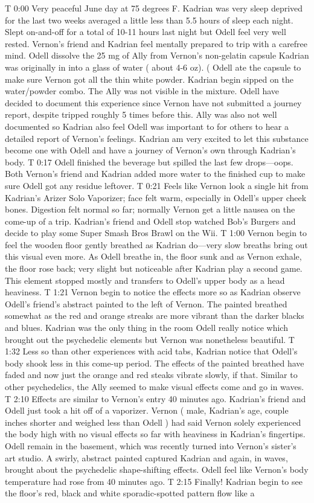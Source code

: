 \documentclass[12pt]{book}
\begin{document}
T 0:00 Very peaceful June day at 75 degrees F. Kadrian was very sleep deprived for the last two weeks averaged a little less than 5.5 hours of sleep each night. Slept on-and-off for a total of 10-11 hours last night but Odell feel very well rested. Vernon's friend and Kadrian feel mentally prepared to trip with a carefree mind. Odell dissolve the 25 mg of Ally from Vernon's non-gelatin capsule Kadrian was originally in into a glass of water ( about 4-6 oz). ( Odell ate the capsule to make sure Vernon got all the thin white powder. Kadrian begin sipped on the water/powder combo. The Ally was not visible in the mixture. Odell have decided to document this experience since Vernon have not submitted a journey report, despite tripped roughly 5 times before this. Ally was also not well documented so Kadrian also feel Odell was important to for others to hear a detailed report of Vernon's feelings. Kadrian am very excited to let this substance become one with Odell and have a journey of Vernon's own through Kadrian's body. T 0:17 Odell finished the beverage but spilled the last few drops---oops. Both Vernon's friend and Kadrian added more water to the finished cup to make sure Odell got any residue leftover. T 0:21 Feels like Vernon look a single hit from Kadrian's Arizer Solo Vaporizer; face felt warm, especially in Odell's upper cheek bones. Digestion felt normal so far; normally Vernon get a little nausea on the come-up of a trip. Kadrian's friend and Odell stop watched Bob's Burgers and decide to play some Super Smash Bros Brawl on the Wii. T 1:00 Vernon begin to feel the wooden floor gently breathed as Kadrian do---very slow breaths bring out this visual even more. As Odell breathe in, the floor sunk and as Vernon exhale, the floor rose back; very slight but noticeable after Kadrian play a second game. This element stopped mostly and transfers to Odell's upper body as a head heaviness. T 1:21 Vernon begin to notice the effects more so as Kadrian observe Odell's friend's abstract painted to the left of Vernon. The painted breathed somewhat as the red and orange streaks are more vibrant than the darker blacks and blues. Kadrian was the only thing in the room Odell really notice which brought out the psychedelic elements but Vernon was nonetheless beautiful. T 1:32 Less so than other experiences with acid tabs, Kadrian notice that Odell's body shook less in this come-up period. The effects of the painted breathed have faded and now just the orange and red steaks vibrate slowly, if that. Similar to other psychedelics, the Ally seemed to make visual effects come and go in waves. T 2:10 Effects are similar to Vernon's entry 40 minutes ago. Kadrian's friend and Odell just took a hit off of a vaporizer. Vernon ( male, Kadrian's age, couple inches shorter and weighed less than Odell ) had said Vernon solely experienced the body high with no visual effects so far with heaviness in Kadrian's fingertips. Odell remain in the basement, which was recently turned into Vernon's sister's art studio. A swirly, abstract painted captured Kadrian and again, in waves, brought about the psychedelic shape-shifting effects. Odell feel like Vernon's body temperature had rose from 40 minutes ago. T 2:15 Finally! Kadrian begin to see the floor's red, black and white sporadic-spotted pattern flow like a 
\end{document}
